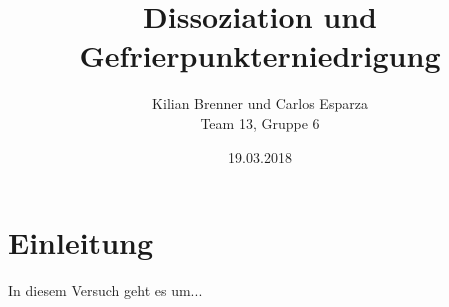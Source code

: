 \documentclass[12pt,a4paper]{article}
\title{Dissoziation und Gefrierpunkterniedrigung}
\author{Kilian Brenner und Carlos Esparza \\ Team 13, Gruppe 6}
\date{19.03.2018}
\begin{document}
\maketitle
\tableofcontents
\newpage

\section{Einleitung}
In diesem Versuch geht es um...













\begin{appendix}

\end{appendix}
\end{document}
